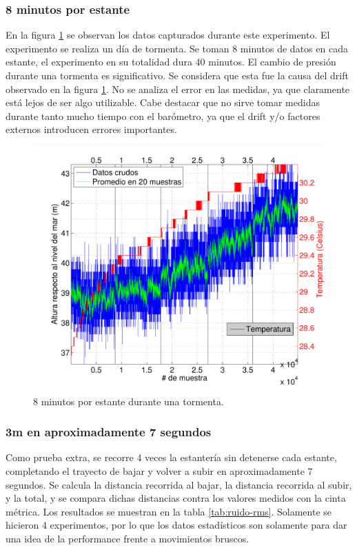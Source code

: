 \documentclass[main]{subfiles}
\begin{document}
\subsubsection{8 minutos por estante}

En la figura \ref{fig:cm-8min-por-estante.pdf} se observan los datos capturados durante este experimento. El experimento se realiza un día de tormenta. Se toman 8 minutos de datos en cada estante, el experimento en su totalidad dura 40 minutos. El cambio de presión durante una tormenta es significativo. Se considera que esta fue la causa del drift observado en la figura \ref{fig:cm-8min-por-estante.pdf}. No se analiza el error en las medidas, ya que claramente está lejos de ser algo utilizable. Cabe destacar que no sirve tomar medidas durante tanto mucho tiempo con el barómetro, ya que el drift y/o factores externos introducen errores importantes.

\begin{figure}[H]
\centering
  \includegraphics[width=1\textwidth]{./pics_barom/cm-8min-por-estante.pdf}
  \caption{8 minutos por estante durante una tormenta.}
  \label{fig:cm-8min-por-estante.pdf}
\end{figure}

\newpage
\subsubsection{3m en aproximadamente 7 segundos}

Como prueba extra, se recorre 4 veces la estantería sin detenerse cada estante, completando el trayecto de bajar y volver a subir en aproximadamente 7 segundos. Se calcula la distancia recorrida al bajar, la distancia recorrida al subir, y la total, y se compara dichas distancias contra los valores medidos con la cinta métrica. Los resultados se muestran en la tabla \ref{tab:ruido-rms}. Solamente se hicieron 4 experimentos, por lo que los datos estadísticos son solamente para dar una idea de la performance frente a movimientos bruscos.
\end{document}
